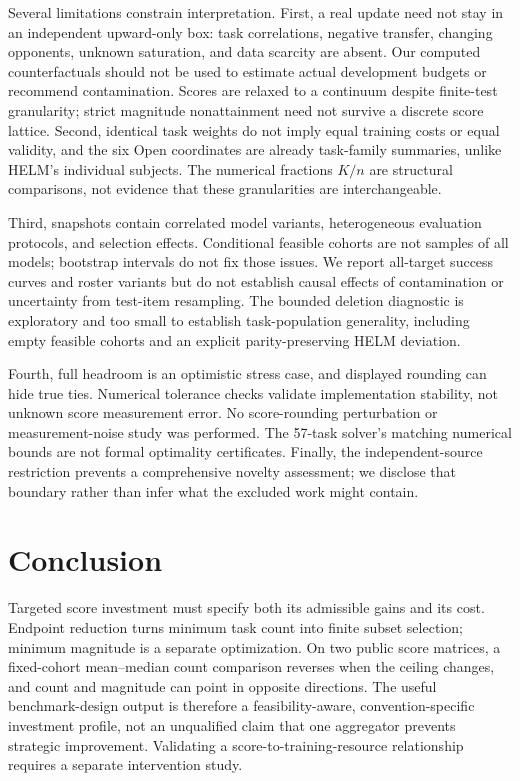 \documentclass{article}
\begin{document}
Several limitations constrain interpretation. First, a real update need not stay in an independent upward-only box: task correlations, negative transfer, changing opponents, unknown saturation, and data scarcity are absent. Our computed counterfactuals should not be used to estimate actual development budgets or recommend contamination. Scores are relaxed to a continuum despite finite-test granularity; strict magnitude nonattainment need not survive a discrete score lattice. Second, identical task weights do not imply equal training costs or equal validity, and the six Open coordinates are already task-family summaries, unlike HELM's individual subjects. The numerical fractions $K/n$ are structural comparisons, not evidence that these granularities are interchangeable.

Third, snapshots contain correlated model variants, heterogeneous evaluation protocols, and selection effects. Conditional feasible cohorts are not samples of all models; bootstrap intervals do not fix those issues. We report all-target success curves and roster variants but do not establish causal effects of contamination or uncertainty from test-item resampling. The bounded deletion diagnostic is exploratory and too small to establish task-population generality, including empty feasible cohorts and an explicit parity-preserving HELM deviation.

Fourth, full headroom is an optimistic stress case, and displayed rounding can hide true ties. Numerical tolerance checks validate implementation stability, not unknown score measurement error. No score-rounding perturbation or measurement-noise study was performed. The 57-task solver's matching numerical bounds are not formal optimality certificates. Finally, the independent-source restriction prevents a comprehensive novelty assessment; we disclose that boundary rather than infer what the excluded work might contain.

\section{Conclusion}
Targeted score investment must specify both its admissible gains and its cost. Endpoint reduction turns minimum task count into finite subset selection; minimum magnitude is a separate optimization. On two public score matrices, a fixed-cohort mean--median count comparison reverses when the ceiling changes, and count and magnitude can point in opposite directions. The useful benchmark-design output is therefore a feasibility-aware, convention-specific investment profile, not an unqualified claim that one aggregator prevents strategic improvement. Validating a score-to-training-resource relationship requires a separate intervention study.
\end{document}
